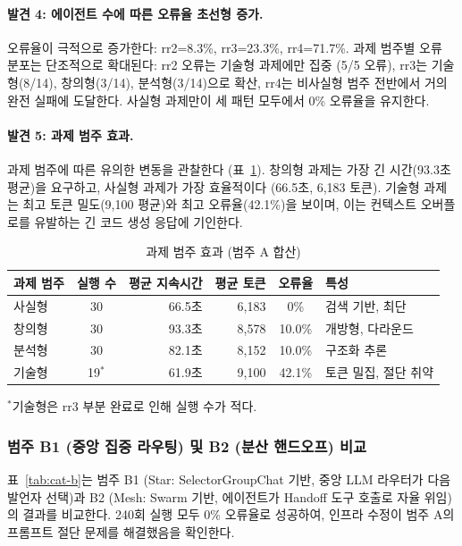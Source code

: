 \documentclass[a4paper,11pt]{article}
\begin{document}
\paragraph{발견 4: 에이전트 수에 따른 오류율 초선형 증가.}
오류율이 극적으로 증가한다: rr2=8.3\%, rr3=23.3\%, rr4=71.7\%. 과제 범주별 오류 분포는 단조적으로 확대된다: rr2 오류는 기술형 과제에만 집중 (5/5 오류), rr3는 기술형(8/14), 창의형(3/14), 분석형(3/14)으로 확산, rr4는 비사실형 범주 전반에서 거의 완전 실패에 도달한다. 사실형 과제만이 세 패턴 모두에서 0\% 오류율을 유지한다.

\paragraph{발견 5: 과제 범주 효과.}
과제 범주에 따른 유의한 변동을 관찰한다 (표~\ref{tab:task-category-effect}). 창의형 과제는 가장 긴 시간(93.3초 평균)을 요구하고, 사실형 과제가 가장 효율적이다 (66.5초, 6,183 토큰). 기술형 과제는 최고 토큰 밀도(9,100 평균)와 최고 오류율(42.1\%)을 보이며, 이는 컨텍스트 오버플로를 유발하는 긴 코드 생성 응답에 기인한다.

\begin{table}[H]
\centering
\caption{과제 범주 효과 (범주 A 합산)}
\label{tab:task-category-effect}
{\small
\begin{tabular}{lcrrc l}
\toprule
과제 범주 & 실행 수 & 평균 지속시간 & 평균 토큰 & 오류율 & 특성 \\
\midrule
사실형 & 30 & 66.5초 & 6,183 & 0\% & 검색 기반, 최단 \\
창의형 & 30 & 93.3초 & 8,578 & 10.0\% & 개방형, 다라운드 \\
분석형 & 30 & 82.1초 & 8,152 & 10.0\% & 구조화 추론 \\
기술형 & 19$^{*}$ & 61.9초 & 9,100 & 42.1\% & 토큰 밀집, 절단 취약 \\
\bottomrule
\end{tabular}
}

\smallskip
{\footnotesize $^{*}$기술형은 rr3 부분 완료로 인해 실행 수가 적다.}
\end{table}

\subsubsection{범주 B1 (중앙 집중 라우팅) 및 B2 (분산 핸드오프) 비교}

표~\ref{tab:cat-b}는 범주 B1 (Star: SelectorGroupChat 기반, 중앙 LLM 라우터가 다음 발언자 선택)과 B2 (Mesh: Swarm 기반, 에이전트가 Handoff 도구 호출로 자율 위임)의 결과를 비교한다. 240회 실행 모두 0\% 오류율로 성공하여, 인프라 수정이 범주 A의 프롬프트 절단 문제를 해결했음을 확인한다.
\end{document}
